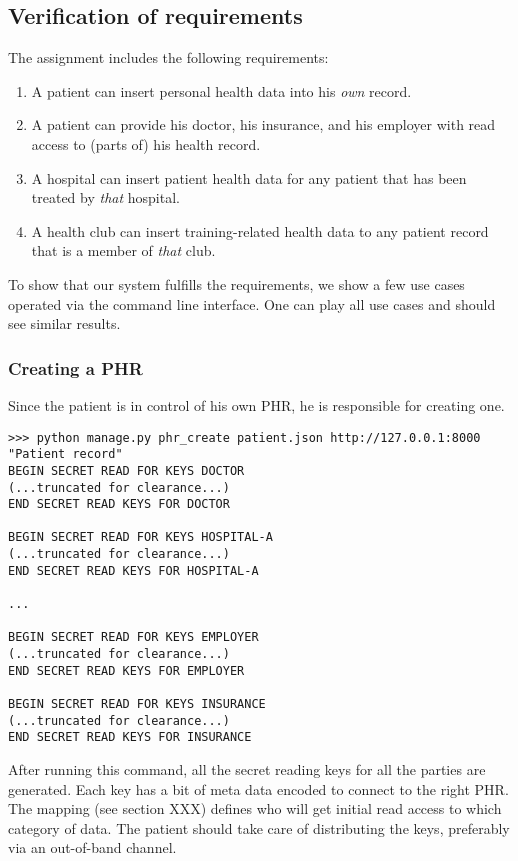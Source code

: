 \documentclass[a4paper]{article}
\begin{document}
	\subsection{Verification of requirements}
		The assignment includes the following requirements:
		
		\begin{enumerate}
			\item{A patient can insert personal health data into his \textit{own} record.}
			\item{A patient can provide his doctor, his insurance, and his employer with read access to (parts of) his health record.}
			\item{A hospital can insert patient health data for any patient that has been treated by \textit{that} hospital.}
			\item{A health club can insert training-related health data to any patient record that is a member of \textit{that} club.}
		\end{enumerate}
		
		To show that our system fulfills the requirements, we show a few use cases operated via the command line interface. One can play all use cases and should see similar results.
		
		\subsubsection{Creating a PHR}\label{sec:usecase_1}
			Since the patient is in control of his own PHR, he is responsible for creating one.
		
			\begin{lstlisting}
>>> python manage.py phr_create patient.json http://127.0.0.1:8000 "Patient record"
BEGIN SECRET READ FOR KEYS DOCTOR
(...truncated for clearance...)
END SECRET READ KEYS FOR DOCTOR

BEGIN SECRET READ FOR KEYS HOSPITAL-A
(...truncated for clearance...)
END SECRET READ KEYS FOR HOSPITAL-A

...

BEGIN SECRET READ FOR KEYS EMPLOYER
(...truncated for clearance...)
END SECRET READ KEYS FOR EMPLOYER

BEGIN SECRET READ FOR KEYS INSURANCE
(...truncated for clearance...)
END SECRET READ KEYS FOR INSURANCE
			\end{lstlisting}
		
			After running this command, all the secret reading keys for all the parties are generated. Each key has a bit of meta data encoded to connect to the right PHR. The mapping (see section XXX) defines who will get initial read access to which category of data. The patient should take care of distributing the keys, preferably via an out-of-band channel.
		
\end{document}
